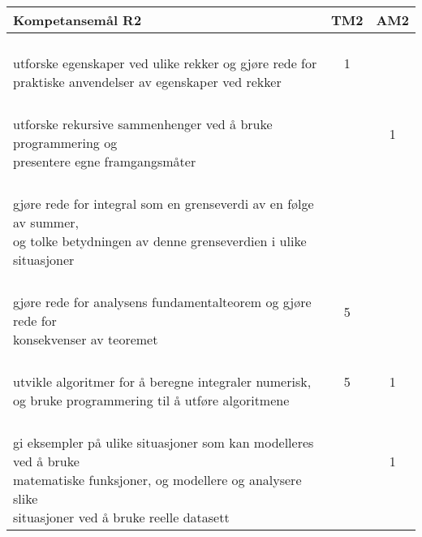 \documentclass{article}
\begin{document}
\begin{center}
\begin{tabular}{p{10.5cm} | c | c |} 
	\textbf{Kompetansemål R2} &	TM2 &AM2 \\ \hline
	\shortstack[l]{\\ utforske egenskaper ved ulike rekker og gjøre rede for \\ praktiske anvendelser av egenskaper ved rekker
	} &\shortstack{1\\{}} &\\ \hline
	
	
	\shortstack[l]{\\ utforske rekursive sammenhenger ved å bruke programmering og\\ presentere egne framgangsmåter
	} &\shortstack{} &\shortstack{1\\{}} \\ \hline
	
	\shortstack[l]{\\gjøre rede for integral som en grenseverdi av en følge av summer,\\ og tolke betydningen av denne grenseverdien i ulike situasjoner
	} &\shortstack{5} &\shortstack{} \\ \hline
	
	\shortstack[l]{\\ gjøre rede for analysens fundamentalteorem og gjøre rede for\\ konsekvenser av teoremet
	} &\shortstack{5\\{}} &\shortstack{} \\ \hline
	
	\shortstack[l]{\\ utvikle algoritmer for å beregne integraler numerisk, \\og bruke programmering til å utføre algoritmene
	} &\shortstack{5\\{}} &\shortstack{1\\{}} \\ \hline
	
	\shortstack[l]{\\ gi eksempler på ulike situasjoner som kan modelleres ved å bruke \\ matematiske funksjoner, og modellere og analysere slike \\ situasjoner ved å bruke reelle datasett
	} &\shortstack{ \\{} \\{}} &\shortstack{1\\{}\\{}} \\ \hline
	

\end{tabular}
\end{center}
\end{document}
